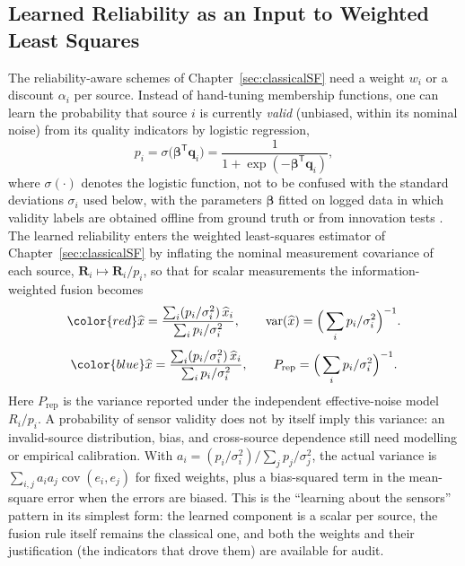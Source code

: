\documentclass[graybox,envcountchap]{style/SNmono}
\providecommand{\DIFadd}[1]{{\protect\color{blue} #1}} %
\providecommand{\DIFdel}[1]{{\protect\color{red} #1}} %
\providecommand{\DIFaddbegin}{} %
\providecommand{\DIFaddend}{} %
\providecommand{\DIFdelbegin}{} %
\providecommand{\DIFdelend}{} %
\begin{document}
\subsection{Learned Reliability as an Input to Weighted Least Squares}
\label{subsec:learned-reliability}
The reliability-aware schemes of Chapter~\ref{sec:classicalSF} need a weight $w_i$ or a discount $\alpha_i$ per source. Instead of hand-tuning membership functions, one can learn the probability that source $i$ is currently \emph{valid} (unbiased, within its nominal noise) from its quality indicators by logistic regression,
\begin{equation}
p_i=\sigma\!\big(\boldsymbol{\beta}^{\mathsf T}\mathbf{q}_i\big)=\frac{1}{1+\exp(-\boldsymbol{\beta}^{\mathsf T}\mathbf{q}_i)},
\label{eq:logistic-reliability}
\end{equation}
where $\sigma(\cdot)$ denotes the logistic function, not to be confused with the standard deviations $\sigma_i$ used below, with the parameters $\boldsymbol{\beta}$ fitted on logged data in which validity labels are obtained offline from ground truth or from innovation tests \cite{bishop2006_prml}. The learned reliability enters the weighted least-squares estimator of Chapter~\ref{sec:classicalSF} by inflating the nominal measurement covariance of each source, $\mathbf{R}_i\mapsto\mathbf{R}_i/p_i$, so that for scalar measurements the information-weighted fusion becomes
\DIFdelbegin \begin{displaymath}
\DIFdel{\widehat{x}=\frac{\sum_i (p_i/\sigma_i^{2})\,\widehat{x}_i}{\sum_i p_i/\sigma_i^{2}},\qquad
\operatorname{var}(\widehat{x})=\Big(\sum_i p_i/\sigma_i^{2}\Big)^{-1}.
}\end{displaymath}%
\DIFdelend \DIFaddbegin \begin{equation}
\DIFadd{\widehat{x}=\frac{\sum_i (p_i/\sigma_i^{2})\,\widehat{x}_i}{\sum_i p_i/\sigma_i^{2}},\qquad
P_{\mathrm{rep}}=\Big(\sum_i p_i/\sigma_i^{2}\Big)^{-1}.
\label{eq:wls-reliability}
}\end{equation}\DIFaddend 
\DIFaddbegin \DIFadd{Here $P_{\mathrm{rep}}$ is the variance reported under the independent effective-noise model $R_i/p_i$. A probability of sensor validity does not by itself imply this variance: an invalid-source distribution, bias, and cross-source dependence still need modelling or empirical calibration. With $a_i=(p_i/\sigma_i^2)/\sum_j p_j/\sigma_j^2$, the actual variance is $\sum_{i,j}a_i a_j\operatorname{cov}(e_i,e_j)$ for fixed weights, plus a bias-squared term in the mean-square error when the errors are biased. }\DIFaddend This is the ``learning about the sensors'' pattern in its simplest form: the learned component is a scalar per source, the fusion rule itself remains the classical one, and both the weights and their justification (the indicators that drove them) are available for audit.
\end{document}
